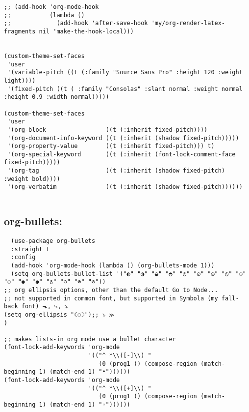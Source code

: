 \documentclass[11pt]{article}
\begin{document}
\begin{verbatim}
;; (add-hook 'org-mode-hook
;;           (lambda ()
;;             (add-hook 'after-save-hook 'my/org-render-latex-fragments nil 'make-the-hook-local)))


(custom-theme-set-faces
 'user
 '(variable-pitch ((t (:family "Source Sans Pro" :height 120 :weight light))))
 '(fixed-pitch ((t ( :family "Consolas" :slant normal :weight normal :height 0.9 :width normal)))))

(custom-theme-set-faces
 'user
 '(org-block                 ((t (:inherit fixed-pitch))))
 '(org-document-info-keyword ((t (:inherit (shadow fixed-pitch)))))
 '(org-property-value        ((t (:inherit fixed-pitch))) t)
 '(org-special-keyword       ((t (:inherit (font-lock-comment-face fixed-pitch)))))
 '(org-tag                   ((t (:inherit (shadow fixed-pitch) :weight bold))))
 '(org-verbatim              ((t (:inherit (shadow fixed-pitch))))))


\end{verbatim}
\subsection{org-bullets:}
\label{sec:orge50653f}
\begin{verbatim}
  (use-package org-bullets
  :straight t
  :config
  (add-hook 'org-mode-hook (lambda () (org-bullets-mode 1)))
  (setq org-bullets-bullet-list '("◐" "◑" "◒" "◓" "◴" "◵" "◶" "◷" "⚆" "⚇" "⚈" "⚉" "♁" "⊖" "⊗" "⊘"))
;; org ellipsis options, other than the default Go to Node...
;; not supported in common font, but supported in Symbola (my fall-back font) ⬎, ⤷, ⤵
(setq org-ellipsis "☾⚇☽");; ⤵ ≫  
)

;; makes lists-in org mode use a bullet character
(font-lock-add-keywords 'org-mode
                        '(("^ *\\([-]\\) "
                           (0 (prog1 () (compose-region (match-beginning 1) (match-end 1) "•"))))))
(font-lock-add-keywords 'org-mode
                        '(("^ *\\([+]\\) "
                           (0 (prog1 () (compose-region (match-beginning 1) (match-end 1) "◦"))))))


\end{verbatim}
\end{document}
